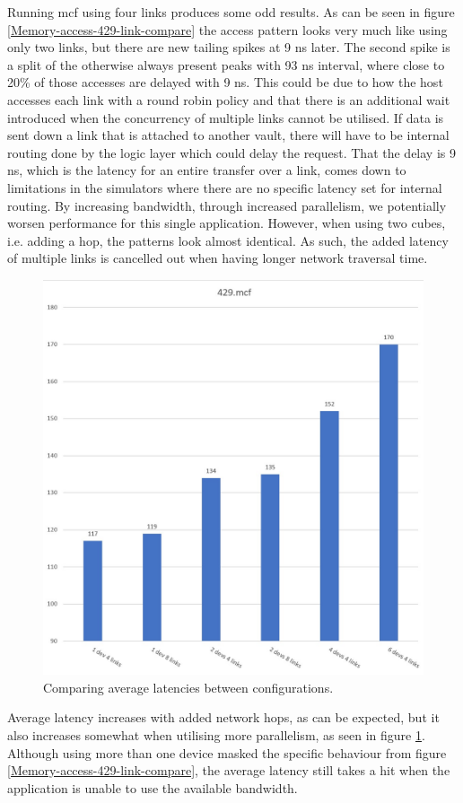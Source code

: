 Running mcf using four links produces some odd results. As can be seen in figure \ref{Memory-access-429-link-compare} the access pattern looks very much like using only two links, but there are new tailing spikes at 9 ns later. The second spike is a split of the otherwise always present peaks with 93 ns interval, where close to 20\% of those accesses are delayed with 9 ns. This could be due to how the host accesses each link with a round robin policy and that there is an additional wait introduced when the concurrency of multiple links cannot be utilised. If data is sent down a link that is attached to another vault, there will have to be internal routing done by the logic layer which could delay the request. That the delay is 9 ns, which is the latency for an entire transfer over a link, comes down to limitations in the simulators where there are no specific latency set for internal routing. By increasing bandwidth, through increased parallelism, we potentially worsen performance for this single application. However, when using two cubes, i.e. adding a hop, the patterns look almost identical. As such, the added latency of multiple links is cancelled out when having longer network traversal time.
\bigskip

\begin{figure}[!ht]
    \centering
    \includegraphics[width=0.75\linewidth]{figure/429-averages.jpg}
    \caption{Comparing average latencies between configurations.}
    \label{Memory-access-429-average-latency}
\end{figure}

Average latency increases with added network hops, as can be expected, but it also increases somewhat when utilising more parallelism, as seen in figure \ref{Memory-access-429-average-latency}. Although using more than one device masked the specific behaviour from figure \ref{Memory-access-429-link-compare}, the average latency still takes a hit when the application is unable to use the available bandwidth.

